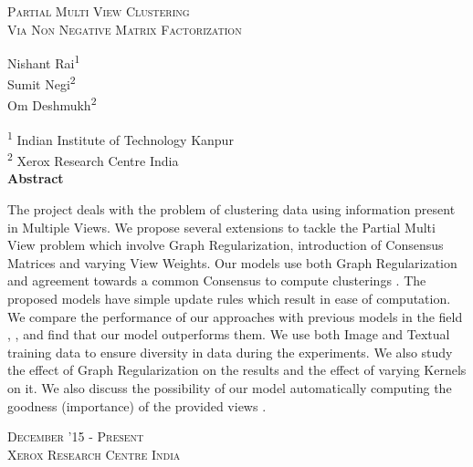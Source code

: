 \documentclass[a4paper]{article}
\begin{document}
	\begin{titlepage}
	    \begin{center}
	        \vspace*{1cm}
	        
	       	\huge{\textsc{Partial Multi View Clustering}}\\
			\Large{\textsc{Via Non Negative Matrix Factorization}}	

	        \vspace{8mm}
	        \large{Nishant Rai\textsuperscript{1}}\\
			\large{Sumit Negi\textsuperscript{2}}\\
			\large{Om Deshmukh\textsuperscript{2}}\\
			\vspace{3mm}
			
			{\normalsize{\textsuperscript{1} Indian Institute of Technology Kanpur\\}}
			{\normalsize{\textsuperscript{2} Xerox Research Centre India\\}}
	        \vspace{4mm}
        	\vspace{7mm}
	        \textbf{Abstract\\}
        	\vspace{4mm}
        	\noindent
{\justifying\small{The project deals with the problem of clustering data using information present in Multiple Views. We propose several extensions to tackle the Partial Multi View problem which involve Graph Regularization, introduction of Consensus Matrices and varying View Weights. Our models use both Graph Regularization \cite{GReg} and agreement towards a common Consensus to compute clusterings \cite{nmfsdm}. The proposed models have simple update rules which result in ease of computation. We compare the performance of our approaches with previous models in the field \cite{GReg}, \cite{nmfsdm}, \cite{pvc15} and find that our model outperforms them. We use both Image and Textual training data \cite{greene2009matrix} to ensure diversity in data during the experiments. We also study the effect of Graph Regularization on the results and the effect of varying Kernels on it. We also discuss the possibility of our model automatically computing the goodness (importance) of the provided views \cite{cai2013multi}.} \par}
			\vfill
            \vspace{3mm}
            \large\textsc{December '15 - Present\\}
            \vspace{1mm}
            \large\textsc{Xerox Research Centre India}
	    \end{center}
	\end{titlepage}
	\restoregeometry
\end{document}
